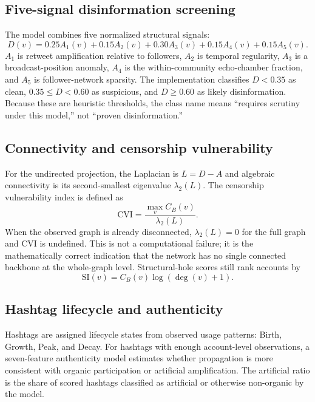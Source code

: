 \documentclass[11pt]{article}
\begin{document}
\subsection{Five-signal disinformation screening}
The model combines five normalized structural signals:
\begin{equation}
D(v)=0.25A_1(v)+0.15A_2(v)+0.30A_3(v)+0.15A_4(v)+0.15A_5(v).
\end{equation}
$A_1$ is retweet amplification relative to followers, $A_2$ is temporal regularity, $A_3$ is a broadcast-position anomaly, $A_4$ is the within-community echo-chamber fraction, and $A_5$ is follower-network sparsity. The implementation classifies $D<0.35$ as clean, $0.35\leq D<0.60$ as suspicious, and $D\geq0.60$ as likely disinformation. Because these are heuristic thresholds, the class name means ``requires scrutiny under this model,'' not ``proven disinformation.''

\subsection{Connectivity and censorship vulnerability}
For the undirected projection, the Laplacian is $L=D-A$ and algebraic connectivity is its second-smallest eigenvalue $\lambda_2(L)$. The censorship vulnerability index is defined as
\begin{equation}
\mathrm{CVI}=\frac{\max_v C_B(v)}{\lambda_2(L)}.
\end{equation}
When the observed graph is already disconnected, $\lambda_2(L)=0$ for the full graph and CVI is undefined. This is not a computational failure; it is the mathematically correct indication that the network has no single connected backbone at the whole-graph level. Structural-hole scores still rank accounts by
\begin{equation}
\mathrm{SI}(v)=C_B(v)\log(\deg(v)+1).
\end{equation}

\subsection{Hashtag lifecycle and authenticity}
Hashtags are assigned lifecycle states from observed usage patterns: Birth, Growth, Peak, and Decay. For hashtags with enough account-level observations, a seven-feature authenticity model estimates whether propagation is more consistent with organic participation or artificial amplification. The artificial ratio is the share of scored hashtags classified as artificial or otherwise non-organic by the model.
\end{document}
